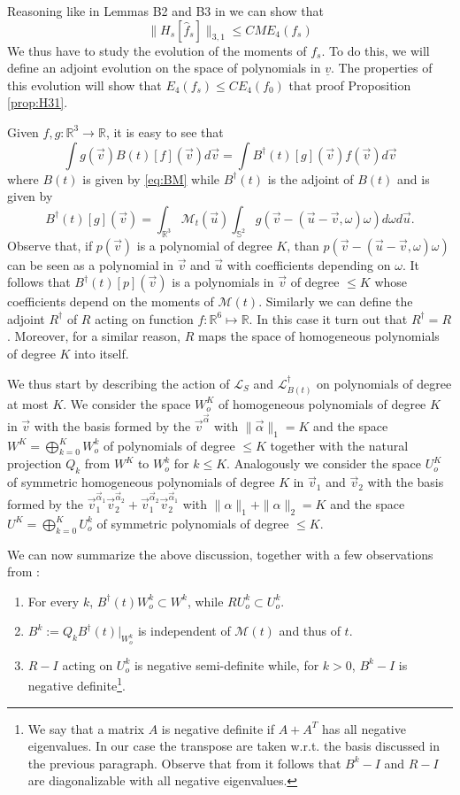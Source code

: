 \documentclass{article}
\newcommand*\R{ \mathds{R} }
\newcommand*\cL{ \mathcal{L} }
\newcommand\uv{{\underline v}}
\newcommand\vv{{\vec v}}
\newcommand\vu{{\vec u}}
\begin{document}
Reasoning like in Lemmas B2 and B3 in \cite{BLP25} we can show that
\[
\|H_s[\hat{f}_s]\|_{3,1}\leq CM E_4(f_s)
\]
We thus have to study the evolution of the moments of
$f_s$. To do this, we will define an adjoint evolution on the space of polynomials in $\uv$. The properties of this 
evolution will show that $E_4(f_s)\leq C E_4(f_0)$ that proof Proposition \ref{prop:H31}.

Given $f,g:\R^3\to\R$, it is easy to see that
\[
\int g(\vv)B(t)[f](\vv)d\vv=\int B^\dagger(t)[g](\vv)f(\vv)d\vv
\]
where $B(t)$ is given by \eqref{eq:BM} while $B^\dagger(t)$ is the adjoint of $B(t)$ and is given by
\[
B^\dagger(t)[g](\vv)=\int_{\R^3}\mathcal M_t(\vu)\int_{\mathds S^2}g(\vv-(\vu-\vv,\omega)\omega)d\omega d\vu.
\]
Observe that, if $p(\vv)$ is a polynomial of degree $K$, than $p(\vv-(\vu-\vv,\omega)\omega)$ can be seen as a
polynomial in $\vv$ and $\vu$ with coefficients depending on $\omega$. It follows that $B^\dagger(t)[p](\vv)$ is a
polynomials in $\vv$ of degree $\leq K$ whose coefficients depend on the moments of $\mathcal M(t)$. Similarly we can
define the adjoint $R^\dagger$ of $R$ acting on function $f:\R^6\mapsto \R$. In this case it turn out that
$R^\dagger=R$. Moreover, for a similar reason, $R$ maps  the space of homogeneous polynomials of degree $K$ into itself.

We thus start by describing the action of $\cL_S$ and $\cL^\dagger_{B(t)}$ on polynomials of degree at most $K$. We
consider the space $W_o^K$ of homogeneous polynomials of degree $K$ in $\vv$ with the basis formed by the
$\vv^{\vec\alpha}$ with $\|\vec\alpha\|_1=K$ and the space $W^K=\bigoplus_{k=0}^K W_o^k$ of polynomials of degree $\leq 
K$
together with the natural projection $Q_k$ from $W^K$ to $W^k_o$ for $k\leq K$. Analogously we consider the space
$U_o^K$ of symmetric homogeneous polynomials of degree $K$ in $\vv_1$ and $\vv_2$ with the basis formed by the
$\vv_1^{\vec\alpha_1}\vv_2^{\vec\alpha_2}+\vv_1^{\vec\alpha_2}\vv_2^{\vec\alpha_1}$ with $\|\alpha\|_1+\|\alpha\|_2=K$
and the space $U^K=\bigoplus_{k=0}^K U_o^k$ of symmetric polynomials of degree $\leq K$.

We can now summarize the above discussion, together with a few observations from \cite{BLP25,BPP}:
\begin{enumerate}
\item For every $k$, $B^\dagger(t)W_o^k\subset W^k$, while $RU_o^k\subset U_o^k$. 

\item $B^k:=Q_k B^\dagger(t)\big|_{W^k_o}$ is independent of $\mathcal M(t)$ and thus of $t$.

\item $R-I$ acting on $U_o^k$ is negative semi-definite while, for $k>0$, $B^k-I$ is negative
definite\footnote{\label{foot:self}We say that a matrix $A$ is negative definite if $A+A^T$ has all negative
eigenvalues. In our case the transpose are taken w.r.t. the basis discussed in the previous paragraph. Observe that from
\cite{BPP} it follows that $B^k-I$ and $R-I$ are diagonalizable with all negative eigenvalues.}.

\end{enumerate}
\end{document}
